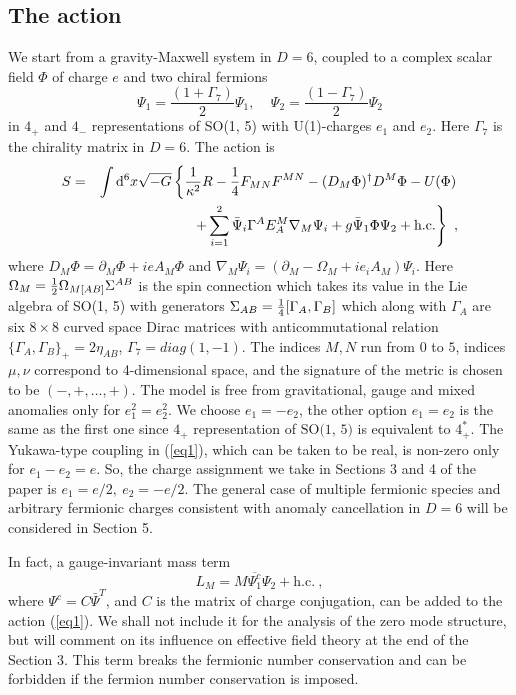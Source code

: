 \documentclass[a4paper,12pt]{article}
\begin{document}
\subsection{The action}
We start from a gravity-Maxwell system in $D=6$, coupled to a complex
scalar field $\Phi$ of charge $e$ and two chiral fermions 
\begin{equation}
\Psi_1= \frac{(1+\Gamma_7)}{2}\Psi_1,~~~~~
\Psi_2=\frac{(1-\Gamma_7)}{2}\Psi_2
\end{equation}
in $4_+$ and $4_-$ representations of SO(1, 5) with U(1)-charges
$e_1$ and $e_2$. Here $\Gamma_7$ is the chirality matrix in $D=6$.
The action is
\begin{eqnarray}
S &=&\int{\rm d}^6 x\sqrt{-G}\left\{{1\over\kappa^2}R
-{1\over 4}F_{MN}F^{MN}-(D_M\Phi)^\dagger D^M\Phi-U(\Phi)
\right.\nonumber\\
&&\qquad
\left.+\sum_{i=1}^2\bar\Psi_i\Gamma^AE_A^M  \nabla_M\Psi_i+
g\bar\Psi_1\Phi\Psi_2+
\mbox{h.c.}\right\}~,
\label{eq1}
\end{eqnarray}
where $D_M\Phi=\partial_M\Phi+i e A_M\Phi$ and
$\nabla_M\Psi_i=(\partial_M-\Omega_M+i e_iA_M)\Psi_i$. Here
$\Omega_M={1\over 2}\Omega_{M[AB]}\Sigma^{AB}$ is the spin connection
which takes its value in the Lie algebra of SO(1, 5) with  generators
$\Sigma_{AB}={1\over 4}[\Gamma_A,\Gamma_B]$  which along with 
$\Gamma_A$ are six $8\times 8$ curved space Dirac matrices with
anticommutational relation  $\{\Gamma_A,\Gamma_B\}_+=2\eta_{AB}$,
$\Gamma_7 = diag(1,-1)$. The indices $M,N$ run from $0$ to $5$,
indices $\mu,\nu$ correspond to 4-dimensional space, and the
signature of the metric is chosen to be $(-,+,\dots,+)$. The model is
free from gravitational, gauge and mixed anomalies only for
$e_1^2=e_2^2$. We choose $e_1=-e_2$, the other option $e_1=e_2$ is
the same as the first one since $4_+$ representation of $\mbox{SO(1,
5)}$ is equivalent to $4_+^*$. The Yukawa-type coupling in
(\ref{eq1}), which can be taken to be real, is non-zero only for
$e_1-e_2=e$. So, the charge assignment we take in Sections 3 and 4 of
the paper is $e_1=e/2,~e_2=-e/2$. The general case of multiple
fermionic species and arbitrary fermionic charges consistent with
anomaly cancellation in $D=6$ will be considered in Section 5. 

In fact, a gauge-invariant mass term
\begin{equation}
L_M=M \overline{\Psi_1^c}\Psi_2 + \mbox{h.c.}~,
\label{majorana}
\end{equation}
where $\Psi^c = C\bar{\Psi}^T$, and $C$ is the matrix of charge
conjugation, can be added to the action (\ref{eq1}). We shall not
include it for the analysis of the zero mode structure, but will
comment on its influence on effective field theory at the end of the
Section 3. This term breaks the fermionic number conservation and can
be forbidden if the fermion number conservation is imposed.
\end{document}
